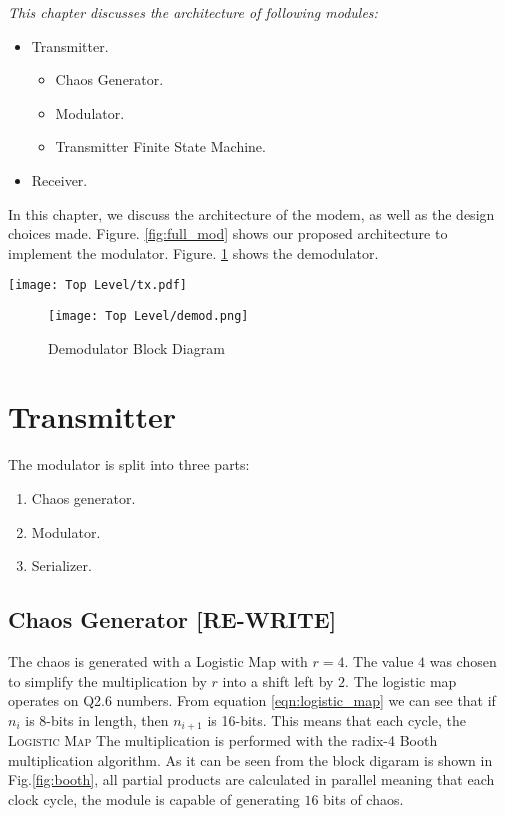 \vfill
\textit{This chapter discusses the architecture of following modules:}
\begin{itemize}
    \item Transmitter.
    \begin{itemize}
        \item Chaos Generator.
        \item Modulator.
        \item Transmitter Finite State Machine.
    \end{itemize}
    \item Receiver.

\end{itemize}
\vfill


\newpage
In this chapter, we discuss the architecture of the modem, as well as the design choices
made. Figure. \ref{fig:full_mod} shows our proposed architecture to implement the modulator.
Figure. \ref{fig:dmod} shows the demodulator.



\begin{sidewaysfigure}
    \label{fig:full_mod}
    \caption{Transmitter Block Diagram}
    \texttt{[image: Top Level/tx.pdf]}
\end{sidewaysfigure}

\begin{figure}[p]
    \label{fig:dmod}
    \caption{Demodulator Block Diagram}
    \texttt{[image: Top Level/demod.png]}
\end{figure}

\section{Transmitter}
The modulator is split into three parts:
\begin{enumerate}
    \item Chaos generator.
    \item Modulator.
    \item Serializer.
\end{enumerate}

\subsection{Chaos Generator [RE-WRITE]}
The chaos is generated with a Logistic Map with $r = 4$. The value $4$ was chosen to simplify the multiplication by $r$ into a shift left by
$2$. The logistic map operates on Q2.6 numbers. From equation \ref{eqn:logistic_map} we can see that if $n_{i}$ is 8-bits in length,
then $n_{i+1}$ is 16-bits. This means that each cycle, the \textsc{Logistic Map} The multiplication is performed with the radix-4 Booth multiplication algorithm. As it
can be seen from the block digaram is shown in Fig.\ref{fig:booth}, all partial products are calculated in parallel meaning that each clock cycle, the module is capable
of generating $16$ bits of chaos.

